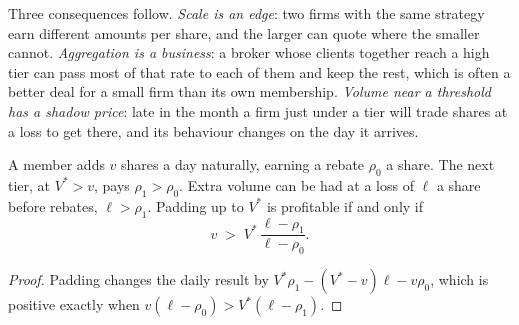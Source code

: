 \begin{omfigure}

\label{fig:m1:getting-access-equities:tiers}
\end{omfigure}

Three consequences follow. \emph{Scale is an edge}: two firms with the same
strategy earn different amounts per share, and the larger can quote where the
smaller cannot. \emph{Aggregation is a business}: a broker whose clients
together reach a high tier can pass most of that rate to each of them and
keep the rest, which is often a better deal for a small firm than its own
membership. \emph{Volume near a threshold has a shadow price}: late in the
month a firm just under a tier will trade shares at a loss to get there, and
its behaviour changes on the day it arrives.

\begin{proposition}\label{prop:m1:getting-access-equities:padding}
A member adds $v$ shares a day naturally, earning a rebate $\rho_0$ a share.
The next tier, at $V^* > v$, pays $\rho_1 > \rho_0$. Extra volume can be had at
a loss of $\ell$ a share before rebates, $\ell > \rho_1$. Padding up to $V^*$
is profitable if and only if
\[
v \;>\; V^*\,\frac{\ell - \rho_1}{\ell - \rho_0}.
\]
\end{proposition}
\begin{proof}
Padding changes the daily result by $V^*\rho_1 - (V^*-v)\ell - v\rho_0$, which
is positive exactly when $v(\ell-\rho_0) > V^*(\ell-\rho_1)$.
\end{proof}

